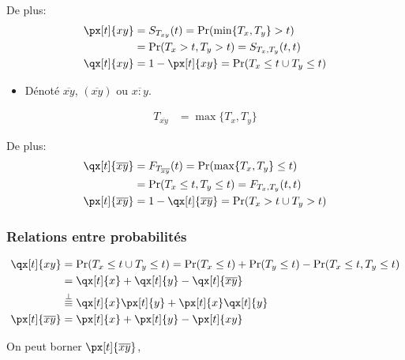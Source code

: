 \documentclass[10pt, french]{article}
\begin{document}
\begin{multicols*}{2}
\begin{definitionNOHFILLsub}
De plus:
\begin{align*}
	\px[t]{xy}
	&=	S_{T_{xy}}(t)
	=	\Pr(\min\{T_{x}, T_{y}\}	>	t)	\\
	&=	\Pr(T_{x} > t, T_{y}	>	t)	
	=	S_{T_{x}, T_{y}}(t, t)	\\
	\qx[t]{xy}
	&=	1 - \px[t]{xy}
	=	\Pr(T_{x} \leq t \cup T_{y}	\leq	t)	
\end{align*}
\end{definitionNOHFILLsub}

\begin{definitionNOHFILLsub}
\begin{itemize}[leftmargin = *]
	\item	Dénoté $\overline{xy}$, $(\overline{xy})$ ou $\overline{x : y}$.
\end{itemize}
\begin{align*}
	T_{\overline{xy}}
	&=	\max\{T_{x}, T_{y}\}	
\end{align*}

De plus:
\begin{align*}
	\qx[t]{\overline{xy}}
	&=	F_{T_{\overline{xy}}}(t)
	=	\Pr(\max\{T_{x}, T_{y}\}	\leq	t)	\\
	&=	\Pr(T_{x} \leq t, T_{y}	\leq	t)	
	=	F_{T_{x}, T_{y}}(t, t)	\\
	\px[t]{\overline{xy}}
	&=	1 - \qx[t]{\overline{xy}}
	=	\Pr(T_{x} > t \cup T_{y}	>	t)	
\end{align*}
\end{definitionNOHFILLsub}

\subsubsection*{Relations entre probabilités}
\begin{align*}
	\qx[t]{xy}
	&=	\Pr(T_{x} \leq t \cup T_{y}	\leq	t)	
	=	\Pr(T_{x} \leq t) + \Pr(T_{y}	\leq	t)	 - \Pr(T_{x} \leq t, T_{y}	\leq	t)	\\
	&=	\qx[t]{x} + \qx[t]{y} - \qx[t]{\overline{xy}}	\\
	&\overset{\perp}{\equiv}	\qx[t]{x}\px[t]{y} + \px[t]{x}\qx[t]{y}	\\
	\px[t]{\overline{xy}}
	&=	\px[t]{x} + \px[t]{y} - \px[t]{xy}	\\
\end{align*}

On peut borner $\px[t]{\overline{xy}}$, 


\end{multicols*}
\end{document}
